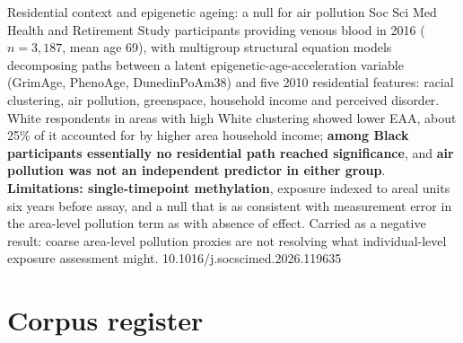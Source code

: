 \documentclass[10pt]{article}
\begin{document}
{Residential context and epigenetic ageing: a null for air pollution}
{Soc Sci Med}
{Health and Retirement Study participants providing venous blood in 2016
($n = 3{,}187$, mean age 69), with multigroup structural equation models decomposing paths
between a latent epigenetic-age-acceleration variable (GrimAge, PhenoAge, DunedinPoAm38)
and five 2010 residential features: racial clustering, air pollution, greenspace,
household income and perceived disorder. White respondents in areas with high White
clustering showed lower EAA, about 25\% of it accounted for by higher area household
income; \textbf{among Black participants essentially no residential path reached
significance}, and \textbf{air pollution was not an independent predictor in either
group}. \textbf{Limitations: single-timepoint methylation}, exposure indexed to areal
units six years before assay, and a null that is as consistent with measurement error in
the area-level pollution term as with absence of effect. Carried as a negative result:
coarse area-level pollution proxies are not resolving what individual-level exposure
assessment might.}
{10.1016/j.socscimed.2026.119635}

\vspace{4mm}

\section*{\sffamily\bfseries\color{Deep}Corpus register}
\vspace{-1.5mm}{\color{Amber}\rule{\linewidth}{1.1pt}}\vspace{2.5mm}


\end{document}
